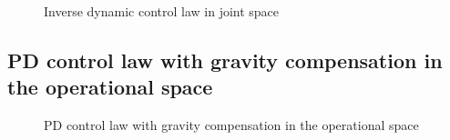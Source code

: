 \documentclass{article}
\begin{document}
\begin{figure}[H]
    \centering
    \caption{Inverse dynamic control law in joint space}
    \label{fig:Inverse dynamic control law in joint space}
\end{figure}

\subsection{PD control law with gravity compensation in the operational space}
\begin{figure}[H]
    \centering
    \caption{PD control law with gravity compensation in the operational space}
    \label{fig:PD control law with gravity compensation in the operational space}
\end{figure}
\end{document}
